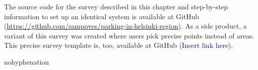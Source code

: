 The source code for the survey described in this chapter and step-by-step information to set up an identical system is available at GitHub (\textcolor{blue}{\url{https://github.com/sampoves/parking-in-helsinki-region}}). As a side product, a variant of this survey was created where users pick precise points instead of areas. This precise survey template is, too, available at GitHub (\textcolor{blue}{Insert link here}).

\begin{hyphenrules}{nohyphenation}
    \begin{table}[H]
        \centering
        \setlength\tabcolsep{1pt}
        \caption{Records} \label{tab:recordstab}
    \end{table} 
\end{hyphenrules}

